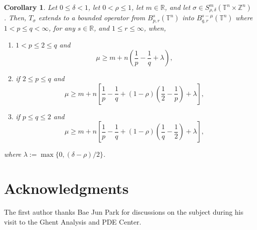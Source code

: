 \documentclass[12pt, reqno]{amsart}
\newtheorem{corollary}[theorem]{Corollary}
\theoremstyle{definition}
\theoremstyle{remark}
\numberwithin{equation}{section}
\begin{document}
\begin{corollary}
    Let $0\leq\delta<1$, let $0<\rho\leq 1$, let $m\in\mathbb{R}$, and let $\sigma\in S^m_{\rho,\delta}(\mathbb{T}^n\times\mathbb{Z}^n)$. Then, $T_\sigma$ extends to a bounded operator from $B^{s}_{p,r}(\mathbb{T}^n)$ into $B^{s-\mu}_{q, r}(\mathbb{T}^n)$ where $1<p\leq q<\infty$, for any $s\in\mathbb{R}$, and $1\leq r\leq \infty$, when,
    \begin{enumerate}
        \item $1<p\leq 2 \leq q$ and 
        \begin{equation*}
            \mu \geq m + n \left( \frac{1}{p} - \frac{1}{q} + \lambda
            \right),
        \end{equation*}
        \item if $2 \leq p \leq q$ and 
        \begin{equation*}
            \mu \geq m + n \left[ \frac{1}{p} - \frac{1}{q} + (1-\rho) \left( \frac{1}{2} - \frac{1}{p}
            \right)
            + \lambda
            \right],
        \end{equation*}
        \item if $p\leq q \leq 2$ and 
        \begin{equation*}
            \mu \geq m + n \left[ \frac{1}{p} - \frac{1}{q} + (1-\rho) \left( \frac{1}{q} - \frac{1}{2}
            \right)
            + \lambda
            \right],
        \end{equation*}
    \end{enumerate}
     where $\lambda := \max\{ 0, (\delta-\rho)/2 \}$. 
\end{corollary}

\section{Acknowledgments}
The first author thanks Bae Jun Park for discussions on the subject during his visit to the Ghent Analysis and PDE Center.
\end{document}
